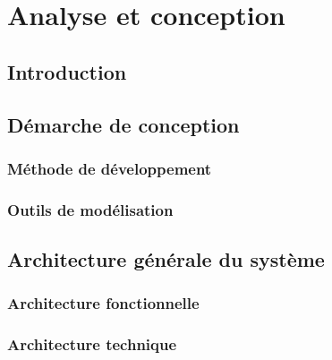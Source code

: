 
\chapter{Analyse et conception}
\label{chap:conception}

\section{Introduction}


\section{Démarche de conception}


\subsection{Méthode de développement}


\subsection{Outils de modélisation}


\section{Architecture générale du système}


\subsection{Architecture fonctionnelle}


\subsection{Architecture technique}


